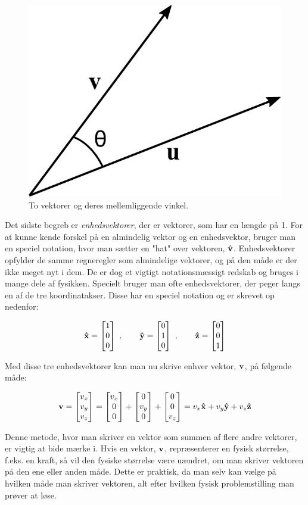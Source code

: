 \begin{figure}[h!]
	\centering
	\includegraphics[scale=0.7]{matematik/fig/dot_cross.pdf}
	\caption{To vektorer og deres mellemliggende vinkel.}
	\label{dot_cross}
\end{figure}

Det sidste begreb er \emph{enhedsvektorer}, der er vektorer, som har en længde på 1. For at kunne kende forskel på en almindelig vektor og en enhedsvektor, bruger man en speciel notation, hvor man sætter en "hat" over vektoren, $\hat{\mathbf{v}}$. Enhedsvektorer opfylder de samme regneregler som almindelige vektorer, og på den måde er der ikke meget nyt i dem. De er dog et vigtigt notationsmæssigt redskab og bruges i mange dele af fysikken. Specielt bruger man ofte enhedsvektorer, der peger langs en af de tre koordinatakser. Disse har en speciel notation og er skrevet op nedenfor:

\begin{equation}
\mathbf{\hat{x}} = \begin{bmatrix} 1 \\ 0 \\ 0 \end{bmatrix} \ , \quad \quad \mathbf{\hat{y}} = \begin{bmatrix} 0 \\ 1 \\ 0 \end{bmatrix} \ , \quad \quad \mathbf{\hat{z}} = \begin{bmatrix} 0 \\ 0 \\ 1 \end{bmatrix}
\end{equation}

\vspace{2mm}

Med disse tre enhedsvektorer kan man nu skrive enhver vektor, $\mathbf{v}$, på følgende måde:

$$\mathbf{v} = \begin{bmatrix} v_x \\ v_y \\ v_z \end{bmatrix} = \begin{bmatrix} v_x \\ 0 \\ 0 \end{bmatrix} + \begin{bmatrix} 0 \\ v_y \\ 0 \end{bmatrix} + \begin{bmatrix} 0 \\ 0 \\ v_z \end{bmatrix} = v_x \mathbf{\hat{x}} + v_y \mathbf{\hat{y}} + v_z \mathbf{\hat{z}}$$

\vspace{2mm}

Denne metode, hvor man skriver en vektor som summen af flere andre vektorer, er vigtig at bide mærke i. Hvis en vektor, $\mathbf{v}$, repræsenterer en fysisk størrelse, f.eks. en kraft, så vil den fysiske størrelse være uændret, om man skriver vektoren på den ene eller anden måde. Dette er praktisk, da man selv kan vælge på hvilken måde man skriver vektoren, alt efter hvilken fysisk problemstilling man prøver at løse. 


